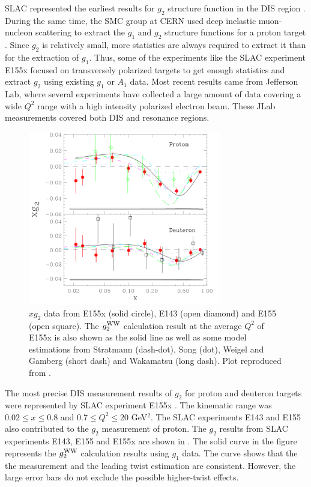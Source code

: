 SLAC represented the earliest results for $g_2$ structure function in the DIS region \cite{Anthony1996}. During the same time, the SMC group at CERN used deep inelastic muon-nucleon scattering to extract the $g_1$ and $g_2$ structure functions for a proton target \cite{Adams1997}. Since $g_2$ is relatively small, more statistics are always required to extract it than for the extraction of $g_1$. Thus, some of the experiments like the SLAC experiment E155x \cite{Anthony2003} focused on transversely polarized targets to get enough statistics and extract $g_2$ using existing $g_1$ or $A_1$ data. Most recent results came from Jefferson Lab, where several experiments have collected a large amount of data covering a wide $Q^2$ range with a high intensity polarized electron beam. These JLab measurements covered both DIS and resonance regions.

\begin{figure}[b!]
  \centering
  \includegraphics[width=0.75\textwidth]{figs/xg2p_E155x.png}
  \caption[$xg_2$ data from SLAC E155x, E143 and E155.]{$xg_2$ data from E155x (solid circle), E143 (open diamond) and E155 (open square). The $g_2^{\mathrm{WW}}$ calculation result at the average $Q^2$ of E155x is also shown as the solid line as well as some model estimations from Stratmann \cite{Stratmann1993} (dash-dot), Song \cite{Song1996}(dot), Weigel and Gamberg \cite{Weigel2001} (short dash) and Wakamatsu \cite{Wakamatsu2000} (long dash). Plot reproduced from \cite{Anthony2003}. \label{C4S1F1}}
\end{figure}

The most precise DIS measurement results of $g_2$ for proton and deuteron targets were represented by SLAC experiment E155x \cite{Anthony2003}. The kinematic range was $0.02\leq x\leq 0.8$ and $0.7\leq Q^2 \leq 20$ GeV${}^2$. The SLAC experiments E143 \cite{Abe1998} and E155 \cite{Anthony2003} also contributed to the $g_2$ measurement of proton. The $g_2$ results from SLAC experiments E143, E155 and E155x are shown in . The solid curve in the figure represents the $g_2^{\mathrm{WW}}$ calculation results using $g_1$ data. The curve shows that the the measurement and the leading twist estimation are consistent. However, the large error bars do not exclude the possible higher-twist effects.

